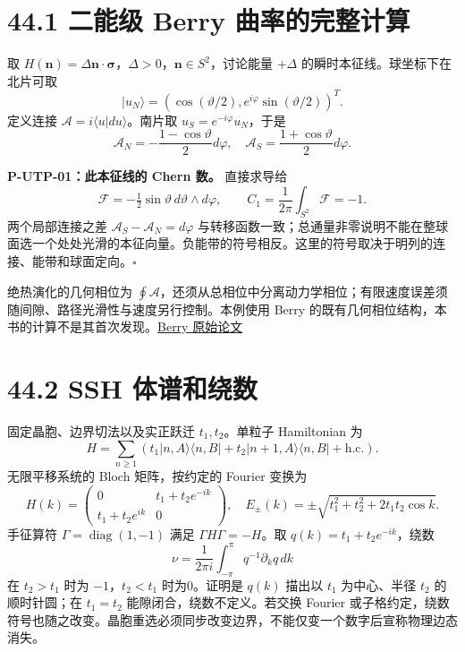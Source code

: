 \documentclass[
  11pt,
  oneside]{book}
\begin{document}
\hypertarget{ux4e8cux80fdux7ea7-berry-ux66f2ux7387ux7684ux5b8cux6574ux8ba1ux7b97}{%
\section{44.1 二能级 Berry
曲率的完整计算}\label{ux4e8cux80fdux7ea7-berry-ux66f2ux7387ux7684ux5b8cux6574ux8ba1ux7b97}}

取
\(H(\mathbf n)=\Delta\mathbf n\cdot\boldsymbol\sigma\)，\(\Delta>0\)，\(\mathbf n\in S^2\)，讨论能量
\(+\Delta\) 的瞬时本征线。球坐标下在北片可取 \[
|u_N\rangle=(\cos(\vartheta/2),e^{i\varphi}\sin(\vartheta/2))^T.
\] 定义连接 \(\mathcal A=i\langle u|du\rangle\)。南片取
\(u_S=e^{-i\varphi}u_N\)，于是 \[
\mathcal A_N=-\frac{1-\cos\vartheta}{2}d\varphi,
\quad \mathcal A_S=\frac{1+\cos\vartheta}{2}d\varphi.
\]

\protect\hypertarget{p-utp-01}{}{}

\textbf{P-UTP-01：此本征线的 Chern 数。} 直接求导给 \[
\mathcal F=-\tfrac12\sin\vartheta\,d\vartheta\wedge d\varphi,
\qquad C_1=\frac1{2\pi}\int_{S^2}\mathcal F=-1.
\] 两个局部连接之差 \(\mathcal A_S-\mathcal A_N=d\varphi\)
与转移函数一致；总通量非零说明不能在整球面选一个处处光滑的本征向量。负能带的符号相反。这里的符号取决于明列的连接、能带和球面定向。\(\square\)

绝热演化的几何相位为
\(\oint\mathcal A\)，还须从总相位中分离动力学相位；有限速度误差须随间隙、路径光滑性与速度另行控制。本例使用
Berry
的既有几何相位结构，本书的计算不是其首次发现。\href{https://doi.org/10.1098/rspa.1984.0023}{Berry
原始论文}

\hypertarget{ssh-ux4f53ux8c31ux548cux7ed5ux6570}{%
\section{44.2 SSH 体谱和绕数}\label{ssh-ux4f53ux8c31ux548cux7ed5ux6570}}

固定晶胞、边界切法以及实正跃迁 \(t_1,t_2\)。单粒子 Hamiltonian 为 \[
H=\sum_{n\ge1}(t_1|n,A\rangle\langle n,B|
+t_2|n+1,A\rangle\langle n,B|+\mathrm{h.c.}).
\] 无限平移系统的 Bloch 矩阵，按约定的 Fourier 变换为 \[
H(k)=\begin{pmatrix}0&t_1+t_2e^{-ik}\\t_1+t_2e^{ik}&0\end{pmatrix},
\quad E_\pm(k)=\pm\sqrt{t_1^2+t_2^2+2t_1t_2\cos k}.
\] 手征算符 \(\Gamma=\operatorname{diag}(1,-1)\) 满足
\(\Gamma H\Gamma=-H\)。取 \(q(k)=t_1+t_2e^{-ik}\)，绕数 \[
\nu=\frac{1}{2\pi i}\int_{-\pi}^{\pi}q^{-1}\partial_kq\,dk
\] 在 \(t_2>t_1\) 时为 \(-1\)，\(t_2<t_1\) 时为0。证明是 \(q(k)\) 描出以
\(t_1\) 为中心、半径 \(t_2\) 的顺时针圆；在 \(t_1=t_2\)
能隙闭合，绕数不定义。若交换 Fourier
或子格约定，绕数符号也随之改变。晶胞重选必须同步改变边界，不能仅变一个数字后宣称物理边态消失。
\end{document}
